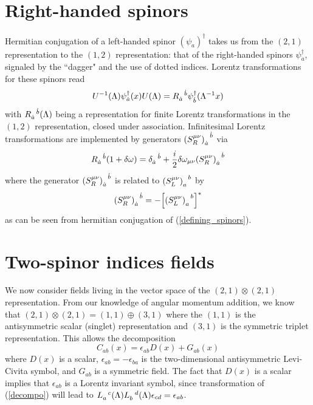 \section{Right-handed spinors}
Hermitian conjugation of a left-handed spinor $(\psi_a)^\dagger$ takes us from the $(2,1)$ representation to the $(1,2)$ representation: that of the right-handed spinors $\psi^\dagger_{\dot{a}}$, signaled by the ``dagger" and the use of dotted indices.
Lorentz transformations for these spinors read
\begin{equation}
    U^{-1}(\Lambda)\psi^\dagger_{\dot{a}}(x)U(\Lambda)=\tend{R}{\dot{a}}{\dot{b}}\psi^\dagger_{\dot{b}}(\Lambda^{-1}x)
\end{equation}
with $\tend{R}{\dot{a}}{\dot{b}}(\Lambda)$ being a representation for finite Lorentz transformations in the $(1,2)$ representation, closed under association.
Infinitesimal Lorentz transformations are implemented by generators $\tend{(S^{\mu\nu}_R)}{\dot{a}}{\dot{b}}$ via
\begin{equation}
    \tend{R}{\dot{a}}{\dot{b}}(1+\delta\omega)=\tend{\delta}{\dot{a}}{\dot{b}}+\frac{i}{2}\delta\omega_{\mu\nu}\tend{(S^{\mu\nu}_R)}{\dot{a}}{\dot{b}}
\end{equation}
where the generator $\tend{(S^{\mu\nu}_R)}{\dot{a}}{\dot{b}}$ is related to $\tend{(S^{\mu\nu}_L)}{a}{b}$ by
\begin{equation}
    \tend{(S^{\mu\nu}_R)}{\dot{a}}{\dot{b}}=-\qty[\tend{(S^{\mu\nu}_L)}{{a}}{{b}}]^*
\end{equation}
as can be seen from hermitian conjugation of (\ref{defining_spinors}).
\section{Two-spinor indices fields}
We now consider fields living in the vector space of the $(2,1)\otimes(2,1)$ representation. From our knowledge of angular momentum addition, we know that $(2,1)\otimes(2,1)=(1,1)\oplus(3,1)$ where the $(1,1)$ is the antisymmetric scalar (singlet) representation and $(3,1)$ is the symmetric triplet representation. This allows the decomposition
\begin{equation}
    C_{ab}(x)=\epsilon_{ab}D(x)+G_{ab}(x)
    \label{decompo}
\end{equation}
where $D(x)$ is a scalar, $\epsilon_{ab}=-\epsilon_{ba}$ is the two-dimensional antisymmetric Levi-Civita symbol, and $G_{ab}$ is a symmetric field.
The fact that $D(x)$ is a scalar implies that $\epsilon_{ab}$ is a Lorentz invariant symbol, since transformation of (\ref{decompo}) will lead to $\tend{L}{a}{c}(\Lambda)\tend{L}{b}{d}(\Lambda)\epsilon_{cd}=\epsilon_{ab}$. \\

